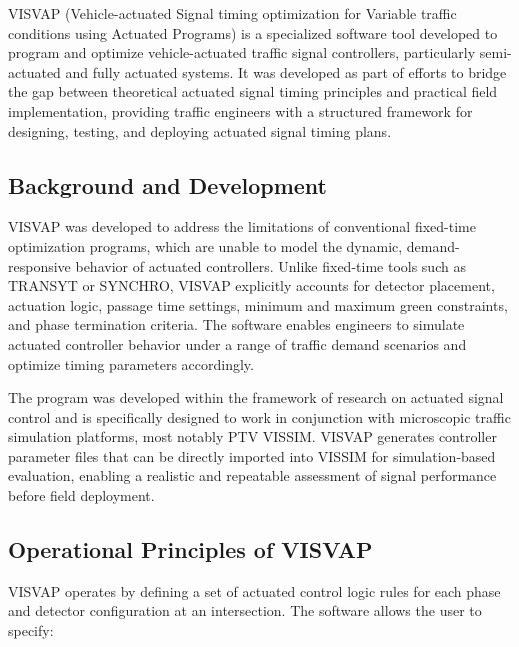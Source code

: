 VISVAP (Vehicle-actuated Signal timing optimization for 
Variable traffic conditions using Actuated Programs) is a 
specialized software tool developed to program and optimize 
vehicle-actuated traffic signal controllers, particularly 
semi-actuated and fully actuated systems. It was developed 
as part of efforts to bridge the gap between theoretical 
actuated signal timing principles and practical field 
implementation, providing traffic engineers with a 
structured framework for designing, testing, and deploying 
actuated signal timing plans.


\subsection{Background and Development}

VISVAP was developed to address the limitations of conventional 
fixed-time optimization programs, which are unable to model 
the dynamic, demand-responsive behavior of actuated controllers. 
Unlike fixed-time tools such as TRANSYT or SYNCHRO, VISVAP 
explicitly accounts for detector placement, actuation logic, 
passage time settings, minimum and maximum green constraints, 
and phase termination criteria. The software enables 
engineers to simulate actuated controller behavior under a 
range of traffic demand scenarios and optimize timing 
parameters accordingly.

The program was developed within the framework of research 
on actuated signal control and is specifically designed to 
work in conjunction with microscopic traffic simulation 
platforms, most notably PTV VISSIM. VISVAP generates 
controller parameter files that can be directly imported 
into VISSIM for simulation-based evaluation, enabling a 
realistic and repeatable assessment of signal performance 
before field deployment.



\subsection{Operational Principles of VISVAP}

VISVAP operates by defining a set of actuated control logic 
rules for each phase and detector configuration at an 
intersection. The software allows the user to specify:

